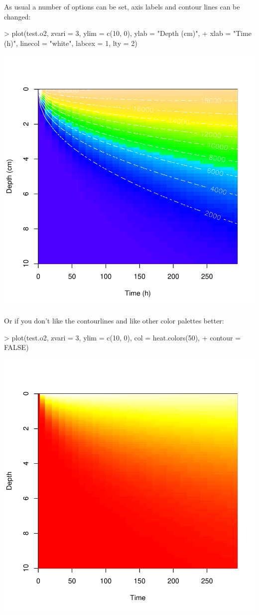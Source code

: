 \documentclass{scrartcl}
\begin{document}
As usual a number of options can be set, axis labels and contour lines
can be changed:
\begin{Schunk}
\begin{Sinput}
> plot(test.o2, zvari = 3, ylim = c(10, 0), ylab = "Depth (cm)", 
+     xlab = "Time (h)", linecol = "white", labcex = 1, lty = 2)
\end{Sinput}
\end{Schunk}
\includegraphics{figures/f-1dC}

Or if you don't like the contourlines and like other color palettes better:
\begin{Schunk}
\begin{Sinput}
> plot(test.o2, zvari = 3, ylim = c(10, 0), col = heat.colors(50), 
+     contour = FALSE)
\end{Sinput}
\end{Schunk}
\includegraphics{figures/f-1Dd}
\end{document}
